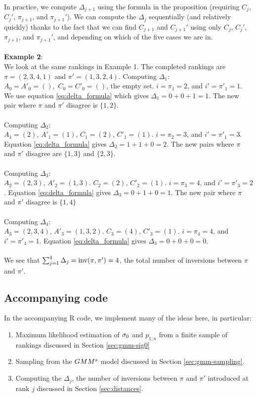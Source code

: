 \documentclass[10pt]{article}
\begin{document}
In practice, we compute $\Delta_{j+1}$ using the formula in the proposition (requiring $C_{j}$, $C_{j}'$, $\pi_{j+1}$, and $\pi_{j+1}'$). We can compute the $\Delta_j$ sequentially (and relatively quickly) thanks to the fact that we can find $C_{j+1}$ and $C_{j+1}'$ using only $C_{j}$, $C_{j}'$, $\pi_{j+1}$, and $\pi_{j+1}'$, and depending on which of the five cases we are in.\\\\
\textbf{Example 2}:\\
We look at the same rankings in Example 1. The completed rankings are $\pi = (2,3,4,1)$ and $\pi' = (1,3,2,4)$.
Computing $\Delta_1$:\\
$A_0 = A'_0 = (),$ $C_0 = C'_0 = ()$, the empty set. $i = \pi_1 = 2$, and $i'= \pi'_1 = 1$. We use equation \eqref{eq:delta_formula} which gives $\Delta_1 = 0 + 0 + 1 = 1$. The new pair where $\pi$ and $\pi'$ disagree is $\{ 1,2 \}$.\\\\
Computing $\Delta_2$:\\
$A_1 = (2)$, $A'_1 = (1)$, $C_1 = (2)$, $C'_1 = (1)$. $i = \pi_2 = 3$, and $i'= \pi'_1 = 3$. Equation \eqref{eq:delta_formula} gives $\Delta_2 = 1 + 1 + 0 = 2$. The new pairs where $\pi$ and $\pi'$ disagree are $\{ 1,3 \}$ and $\{2,3\}$.\\\\
Computing $\Delta_3$:\\
$A_2 = (2,3)$, $A'_2 = (1,3)$. $C_2 = (2)$, $C'_2 = (1)$. $i = \pi_3 = 4$, and $i'= \pi'_3 = 2$. Equation \eqref{eq:delta_formula} gives $\Delta_3 = 0 + 1 + 0 = 1$. The new pair where $\pi$ and $\pi'$ disagree is $\{1,4\}$\\\\
Computing $\Delta_4$:\\
$A_3 = (2,3,4)$, $A'_3 = (1,3,2)$. $C_3 = (4)$, $C'_3 = (1)$. $i = \pi_4 = 4$, and $i'= \pi'_4 = 1$. Equation \eqref{eq:delta_formula} gives $\Delta_3 = 0 + 0 + 0 = 0$.\\\\
We see that $\sum_{j=1}^4\Delta_j =\operatorname{inv}(\pi,\pi') = 4$, the total number of inversions between $\pi$ and $\pi'$.
\subsection{Accompanying code}
In the accompanying R code, we implement many of the ideas here, in particular:
\begin{enumerate}
    \item Maximum likelihood estimation of $\sigma_0$ and $p_{1:n}$ from a finite sample of rankings discussed in Section \ref{sec:gmm-sig0}
    \item Sampling from the $GMM^s$ model discussed in Section \ref{sec:gmm-sampling}.
    \item Computing the $\Delta_j$, the number of inversions between $\pi$ and $\pi'$ introduced at rank $j$ discussed in Section \ref{sec:distances}.
\end{enumerate}
\end{document}
